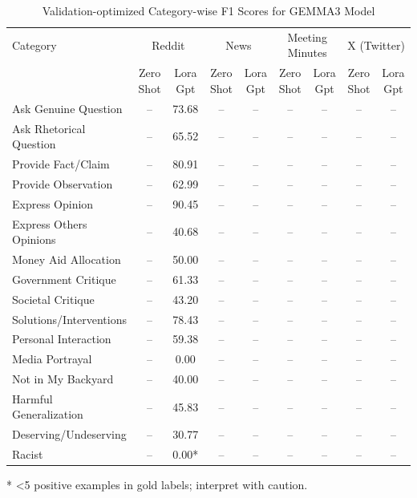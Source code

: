 \begin{table}[htbp]
\centering
\begin{tabular}{l *{8}{c}}
\toprule
Category & \multicolumn{2}{c}{Reddit} & \multicolumn{2}{c}{News} & \multicolumn{2}{c}{Meeting Minutes} & \multicolumn{2}{c}{X (Twitter)} \\
& Zero Shot & Lora Gpt & Zero Shot & Lora Gpt & Zero Shot & Lora Gpt & Zero Shot & Lora Gpt \\
\midrule
Ask Genuine Question & -- & 73.68 & -- & -- & -- & -- & -- & -- \\
Ask Rhetorical Question & -- & 65.52 & -- & -- & -- & -- & -- & -- \\
Provide Fact/Claim & -- & 80.91 & -- & -- & -- & -- & -- & -- \\
Provide Observation & -- & 62.99 & -- & -- & -- & -- & -- & -- \\
Express Opinion & -- & 90.45 & -- & -- & -- & -- & -- & -- \\
Express Others Opinions & -- & 40.68 & -- & -- & -- & -- & -- & -- \\
Money Aid Allocation & -- & 50.00 & -- & -- & -- & -- & -- & -- \\
Government Critique & -- & 61.33 & -- & -- & -- & -- & -- & -- \\
Societal Critique & -- & 43.20 & -- & -- & -- & -- & -- & -- \\
Solutions/Interventions & -- & 78.43 & -- & -- & -- & -- & -- & -- \\
Personal Interaction & -- & 59.38 & -- & -- & -- & -- & -- & -- \\
Media Portrayal & -- & 0.00 & -- & -- & -- & -- & -- & -- \\
Not in My Backyard & -- & 40.00 & -- & -- & -- & -- & -- & -- \\
Harmful Generalization & -- & 45.83 & -- & -- & -- & -- & -- & -- \\
Deserving/Undeserving & -- & 30.77 & -- & -- & -- & -- & -- & -- \\
Racist & -- & 0.00* & -- & -- & -- & -- & -- & -- \\
\bottomrule
\end{tabular}
\vspace{0.25em}
\footnotesize{* <5 positive examples in gold labels; interpret with caution.}
\centering\caption{Validation-optimized Category-wise F1 Scores for GEMMA3 Model}
\label{tab:gemma3_category_breakdown}
\end{table}